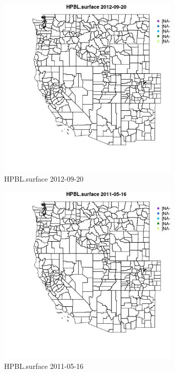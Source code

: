\begin{figure} 
\centering  
\includegraphics[width=0.77\textwidth]{Code_Outputs/ML_input_report_ML_input_PM25_Step5_part_d_de_duplicated_aves_ML_input_MapObsHPBLsurface2012-09-20.jpg} 
\caption{\label{fig:ML_input_report_ML_input_PM25_Step5_part_d_de_duplicated_aves_ML_inputMapObsHPBLsurface2012-09-20}HPBL.surface 2012-09-20} 
\end{figure} 
 

\begin{figure} 
\centering  
\includegraphics[width=0.77\textwidth]{Code_Outputs/ML_input_report_ML_input_PM25_Step5_part_d_de_duplicated_aves_ML_input_MapObsHPBLsurface2011-05-16.jpg} 
\caption{\label{fig:ML_input_report_ML_input_PM25_Step5_part_d_de_duplicated_aves_ML_inputMapObsHPBLsurface2011-05-16}HPBL.surface 2011-05-16} 
\end{figure} 
 

